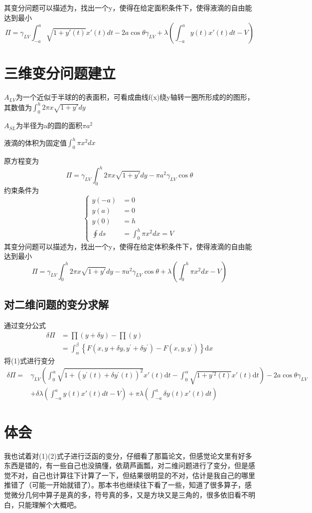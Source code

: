\documentclass{article}
\begin{document}
其变分问题可以描述为，找出一个y，使得在给定面积条件下，使得液滴的自由能达到最小
\begin{equation}
\varPi=\gamma_{LV} \int^{a}_{-a} \sqrt{1+y'(t)}x'(t)dt - 2a\cos \theta \gamma_{LV}+\lambda(\int_{-a}^{a}y(t)x'(t)dt-V)
\end{equation}

\section{三维变分问题建立}
$A_{LV}$为一个近似于半球的的表面积，可看成曲线f(x)绕y轴转一圈所形成的的图形，其数值为$\int^{h}_{0} 2\pi x \sqrt{1+y'}dy$

$A_{SL}$为半径为a的圆的面积$\pi a^{2}$

液滴的体积为固定值$\int_{0}^{h}\pi x^{2}dx$

原方程变为
\begin{equation*}
\varPi=\gamma_{LV} \int^{h}_{0} 2\pi x \sqrt{1+y'}dy - \pi a^{2}\gamma_{LV}\cos \theta 
\end{equation*}
约束条件为
\begin{equation*}
\left\{
\begin{aligned}
y(-a)    & =  0 \\
y(a)     & =  0 \\
y(0)     & =  h \\
\oint ds & =  \int_{0}^{h}\pi x^{2}dx = V
\end{aligned}
\right.
\end{equation*}
其变分问题可以描述为，找出一个y，使得在给定体积条件下，使得液滴的自由能达到最小
\begin{equation}
\varPi=\gamma_{LV} \int^{h}_{0} 2\pi x \sqrt{1+y'}dy - \pi a^{2}\gamma_{LV}\cos \theta +\lambda(\int_{0}^{h}\pi x^{2}dx-V)
\end{equation}

\subsection{对二维问题的变分求解}
通过变分公式
\begin{equation*}
\begin{aligned} \delta \Pi &=\prod(y+\delta y)-\prod(y) \\ &=\int_{\alpha}^{\beta}\left\{F\left(x, y+\delta y, y^{\prime}+\delta y^{\prime}\right)-F\left(x, y, y^{\prime}\right)\right\} \mathrm{d} x \end{aligned}
\end{equation*}
将(1)式进行变分
\begin{align*}
\delta \Pi=&\gamma_{LV}(\int_{0}^{\alpha}\sqrt{1+\left(y^{\prime}(t)+\delta y^{\prime}(t)\right)^{2}} x'(t)\mathrm{d} t-\int_{0}^{\alpha}\sqrt{1+y^{\prime 2}(t)} x'(t)\mathrm{d} t) - 2a\cos \theta \gamma_{LV}\\&+\delta\lambda(\int_{-a}^{a}y(t)x'(t)dt-V)
 +\pi\lambda(\int_{-a}^{a}\delta y(t)x'(t)dt)
\end{align*}
\section{体会}\setlength{\parindent}{2em}
我也试着对(1)(2)式子进行泛函的变分，仔细看了那篇论文，但感觉论文里有好多东西是错的，有一些自己也没搞懂，依葫芦画瓢，对二维问题进行了变分，但是感觉不对，自己也计算往下计算了一下，但结果很明显的不对，估计是我自己的哪里推错了（可能一开始就错了）。那本书也继续往下看了一些，知道了很多算子，感觉微分几何中算子是真的多，符号真的多，又是方块又是三角的，很多依旧看不明白，只能理解个大概吧。
\end{document}
